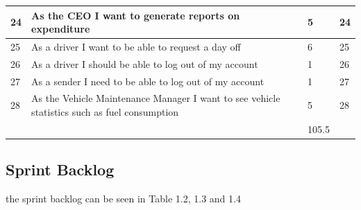 \documentclass[paper=a4, fontsize=11pt]{scrartcl} %
\numberwithin{equation}{section} %
\numberwithin{figure}{section} %
\numberwithin{table}{section} %
\begin{document}
\begin{table}[!hbt]
\begin{tabular}{|p{1cm}|p{8cm}|p{2cm}|p{1.2cm}|}
24          & As the CEO I want to generate reports on expenditure                                                   & 5                 & 24                \\ \hline
25          & As a driver I want to be able to request a day off                                                     & 6                 & 25                \\ \hline
26          & As a driver I should be able to log out of my account                                                  & 1                 & 26                \\ \hline
27          & As a sender I need to be able to log out of my account                                                 & 1                 & 27                \\ \hline
28          & As the Vehicle Maintenance Manager I want to see vehicle statistics such as fuel consumption           & 5                 & 28                \\ \hline
            &                                                                                                        & 105.5             &                   \\ \hline
\end{tabular}
\end{table}
\subsection{Sprint Backlog}

the sprint backlog can be seen in Table 1.2, 1.3 and 1.4
\end{document}
